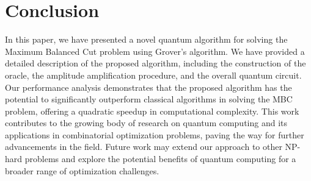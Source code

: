 \section{Conclusion}
\label{sec:conclusion}

In this paper, we have presented a novel quantum algorithm for solving the Maximum Balanced Cut problem using Grover's algorithm. We have provided a detailed description of the proposed algorithm, including the construction of the oracle, the amplitude amplification procedure, and the overall quantum circuit. Our performance analysis demonstrates that the proposed algorithm has the potential to significantly outperform classical algorithms in solving the MBC problem, offering a quadratic speedup in computational complexity. This work contributes to the growing body of research on quantum computing and its applications in combinatorial optimization problems, paving the way for further advancements in the field. Future work may extend our approach to other NP-hard problems and explore the potential benefits of quantum computing for a broader range of optimization challenges.

